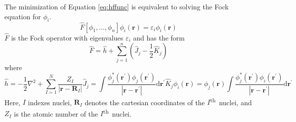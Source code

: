 \documentclass[final,3p,times,twocolumn]{elsarticle}
\newcommand{\ssth}{\textsuperscript{th}}
\begin{document}
The minimization of Equation \eqref{eq:hffunc} is equivalent to solving the Fock equation for $\phi_i$.%
\begin{equation} \label{eq:fockeq}
\hat F[\phi_1, \ldots, \phi_n] \phi_i(\mathbf{r}) = \varepsilon_i \phi_i(\mathbf{r})
\end{equation}
$\hat F$ is the Fock operator with eigenvalues $\varepsilon_i$ and has the form
\begin{equation} \label{eq:fockoperator}
\hat F = \hat h  + \sum_{j=1}^n \left( \hat J_j - \frac{1}{2}\hat K_j \right)
\end{equation}
where
\begin{subequations}
\begin{equation} \label{eq:fockcore}
\hat h = -\frac{1}{2}\nabla^2 + \sum_{I = 1}^N \frac{Z_I}{|\mathbf{r} - \mathbf{R}_I|} 
\end{equation}
\begin{equation} \label{eq:fockcoloumb}
\hat J_j = \int \frac{\phi_j^*(\mathbf{r}^\prime)\phi_j(\mathbf{r}^\prime)}{|\mathbf{r}-\mathbf{r}^\prime|} \mathrm{d}\mathbf{r}^\prime
\end{equation}
\begin{equation} \label{eq:fockexchange}
\hat K_j \phi_i(\mathbf{r}) = \phi_j(\mathbf{r})\int \frac{\phi_j^*(\mathbf{r}^\prime)\phi_i(\mathbf{r}^\prime)}{|\mathbf{r}-\mathbf{r^\prime}|} \mathrm{d}\mathbf{r}^\prime
\end{equation}
\end{subequations}
Here, $I$ indexes nuclei, $\mathbf{R}_I$ denotes the cartesian coordinates of the $I$\ssth\ nuclei, and $Z_I$ is the atomic number of the $I$\ssth\ nuclei.
\end{document}
